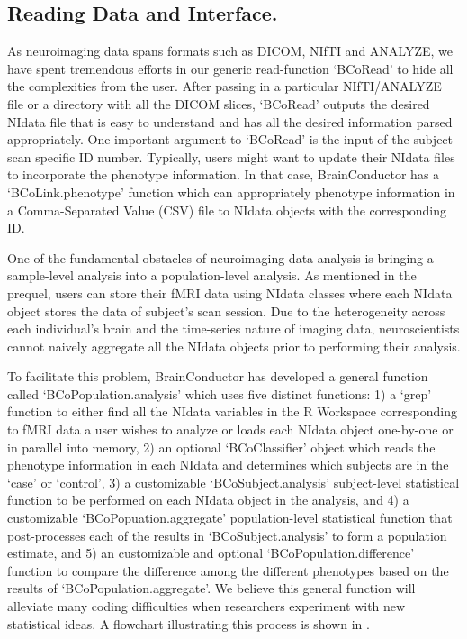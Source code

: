 \documentclass{nature}
\begin{document}
\subsection{Reading Data and Interface.}
As neuroimaging data spans formats such as DICOM, NIfTI and ANALYZE, we have
spent tremendous efforts in our generic read-function `BCoRead' to hide
all the complexities from the user. After passing in a particular NIfTI/ANALYZE
file
or a directory with all the DICOM slices, `BCoRead' outputs the desired NIdata
file
that is easy to understand and has all the desired information parsed
appropriately.
One important argument to `BCoRead' is the input of the subject-scan specific ID
number. 
Typically, users might want to update their NIdata files to incorporate the
phenotype information. In that case, BrainConductor has a `BCoLink.phenotype'
function
which can appropriately phenotype information in a Comma-Separated Value (CSV)
file
to NIdata objects with the corresponding ID.

One of the fundamental obstacles of neuroimaging data analysis is bringing a
sample-level
analysis into a population-level analysis. As mentioned in the prequel, users
can
store their fMRI data using NIdata classes where each NIdata object stores the
data of
subject's scan session. Due to the heterogeneity across each individual's brain
and
the time-series nature of imaging data,
neuroscientists cannot naively aggregate all the NIdata objects prior to
performing their
analysis.

To facilitate this problem, BrainConductor has developed a general function
called
`BCoPopulation.analysis' which uses five distinct functions: 1) a `grep'
function to either
find all the NIdata variables in the R Workspace corresponding to fMRI data a
user wishes
to analyze or loads each NIdata object one-by-one or in parallel into memory,
2) an optional `BCoClassifier' object which reads the phenotype information
in each NIdata and determines which subjects are in the `case' or `control', 3)
a customizable `BCoSubject.analysis' subject-level statistical function to be
performed on each NIdata object in the
analysis, and 4) a customizable `BCoPopuation.aggregate' population-level
statistical function
that post-processes each of the results in `BCoSubject.analysis' to form a
population
estimate, and 5) an customizable and optional `BCoPopulation.difference'
function
to compare the difference among the different phenotypes based on the
results of `BCoPopulation.aggregate'. We believe this general
function will alleviate many coding difficulties when researchers experiment
with
new statistical ideas. A flowchart illustrating this process is shown in
.
\end{document}
